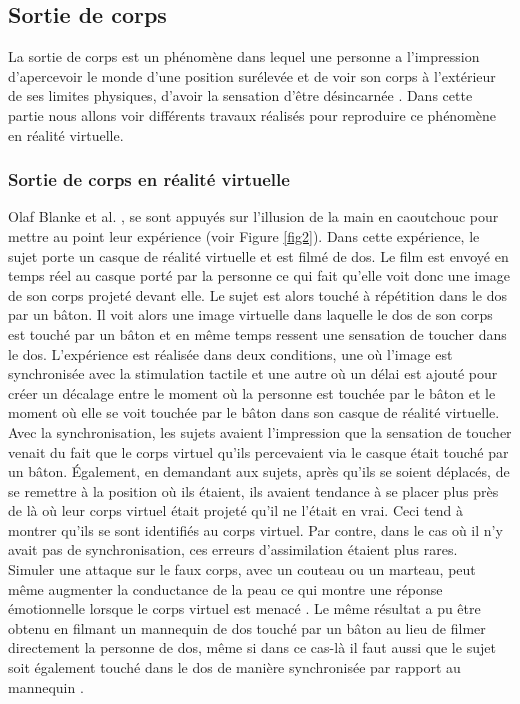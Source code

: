 \subsection{Sortie de corps}

La sortie de corps est un phénomène dans lequel une personne a l'impression d'apercevoir le monde d'une position surélevée et de voir son corps à l'extérieur de ses limites physiques, d'avoir la sensation d'être désincarnée \cite{bl10}. Dans cette partie nous allons voir différents travaux réalisés pour reproduire ce phénomène en réalité virtuelle. 
\subsubsection{Sortie de corps en réalité virtuelle}

Olaf Blanke et al. \cite{le07}, se sont appuyés sur l'illusion de la main en caoutchouc pour mettre au point leur expérience (voir Figure \ref{fig2}). Dans cette expérience, le sujet porte un casque de réalité virtuelle et est filmé de dos. Le film est envoyé en temps réel au casque porté par la personne ce qui fait qu'elle voit donc une image de son corps projeté devant elle. Le sujet est alors touché à répétition dans le dos par un bâton. Il voit alors une image virtuelle dans laquelle le dos de son corps est touché par un bâton et en même temps ressent une sensation de toucher dans le dos. L'expérience est réalisée dans deux conditions, une où l'image est synchronisée avec la stimulation tactile et une autre où un délai est ajouté pour créer un décalage entre le moment où la personne est touchée par le bâton et le moment où elle se voit touchée par le bâton dans son casque de réalité virtuelle. Avec la synchronisation, les sujets avaient l'impression que la sensation de toucher venait du fait que le corps virtuel qu’ils percevaient via le casque était touché par un bâton. \'{E}galement, en demandant aux sujets, après qu'ils se soient déplacés, de se remettre à la position où ils étaient, ils avaient tendance à se placer plus près de là où leur corps virtuel était projeté qu'il ne l'était en vrai. Ceci tend à montrer qu'ils se sont identifiés au corps virtuel. Par contre, dans le cas où il n'y avait pas de synchronisation, ces erreurs d'assimilation étaient plus rares.\\

Simuler une attaque sur le faux corps, avec un couteau ou un marteau, peut même augmenter la conductance de la peau ce qui montre une réponse émotionnelle lorsque le corps virtuel est menacé \cite{eh07}. Le même résultat a pu être obtenu en filmant un mannequin de dos touché par un bâton au lieu de filmer directement la personne de dos, même si dans ce cas-là il faut aussi que le sujet soit également touché dans le dos de manière synchronisée par rapport au mannequin \cite{le07}.\\

